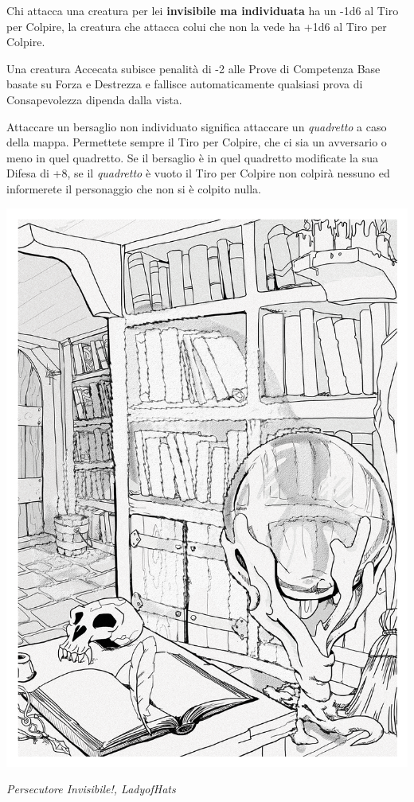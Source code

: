 \begin{multicols}{2}
Chi attacca una creatura per lei \textbf{invisibile ma individuata} ha un -1d6 al Tiro per Colpire, la creatura che attacca colui che non la vede ha +1d6 al Tiro per Colpire.

Una creatura Accecata subisce penalità di -2 alle Prove di Competenza Base basate su Forza e Destrezza e fallisce automaticamente qualsiasi prova di Consapevolezza dipenda dalla vista.

Attaccare un bersaglio non individuato significa attaccare un \emph{quadretto} a caso della mappa. Permettete sempre il Tiro per Colpire, che ci sia un avversario o meno in quel quadretto. Se il bersaglio è in quel quadretto modificate la sua Difesa di +8, se il \emph{quadretto} è vuoto il Tiro per Colpire non colpirà nessuno ed informerete il personaggio che non si è colpito nulla.

\medskip
\begin{center}

	\includegraphics[width=0.8\linewidth]{immagini/DnD_Invisible_stalker.png}

	\emph{Persecutore Invisibile!, LadyofHats}

\end{center}


\end{multicols}
